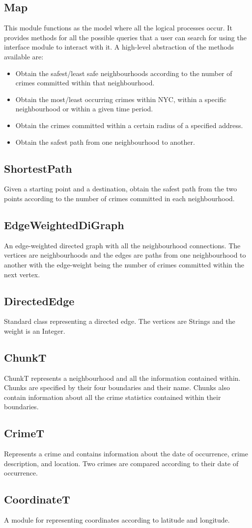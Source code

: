 \documentclass[12pt]{article}
\begin{document}
\subsection*{Map}
This module functions as the model where all the logical processes occur. It provides methods for all the possible queries that a user can search for using the interface module to interact with it. A high-level abstraction of the methods available are:
\begin{itemize}
    \item Obtain the safest/least safe neighbourhoods according to the number of crimes committed within that neighbourhood.
    \item Obtain the most/least occurring crimes within NYC, within a specific neighbourhood or within a given time period.
    \item Obtain the crimes committed within a certain radius of a specified address.
    \item Obtain the safest path from one neighbourhood to another.
\end{itemize}

\subsection*{ShortestPath}
Given a starting point and a destination, obtain the safest path from the two points according to the number of crimes committed in each neighbourhood.

\subsection*{EdgeWeightedDiGraph}
An edge-weighted directed graph with all the neighbourhood connections. The vertices are neighbourhoods and the edges are paths from one neighbourhood to another with the edge-weight being the number of crimes committed within the next vertex.

\subsection*{DirectedEdge}
Standard class representing a directed edge. The vertices are Strings and the weight is an Integer.

\subsection*{ChunkT}
ChunkT represents a neighbourhood and all the information contained within. Chunks are specified by their four boundaries and their name. Chunks also contain information about all the crime statistics contained within their boundaries.

\subsection*{CrimeT}
Represents a crime and contains information about the date of occurrence, crime description, and location. Two crimes are compared according to their date of occurrence.

\subsection*{CoordinateT}
A module for representing coordinates according to latitude and longitude.
\end{document}
